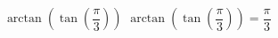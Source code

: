  {$\arctan\left(\tan\left(\dfrac{\pi}{3}\right) \right)$ }
{ $\arctan\left(\tan\left(\dfrac{\pi}{3}\right) \right) = \dfrac{\pi}{3}$}
